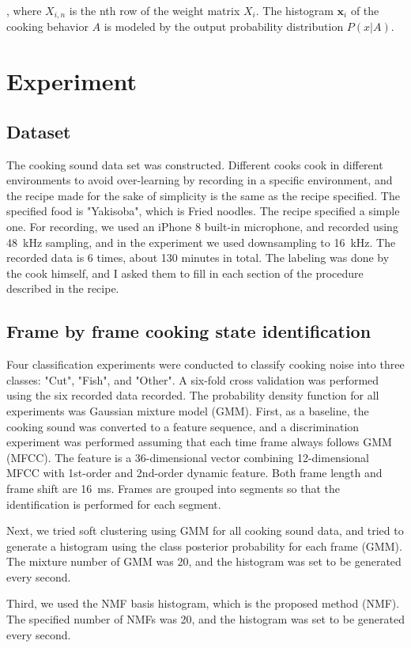 \documentclass[sigconf]{acmart}
\begin{document}
, where $ X_ {i, n} $ is the nth row of the weight matrix $ X_i $.
The histogram $ \bm {x} _i $ of the cooking behavior $ A $ is modeled by the output probability distribution $ P (x | A) $.

\section{Experiment}
\subsection{Dataset}
The cooking sound data set was constructed. Different cooks cook in different environments to avoid over-learning by recording in a specific environment, and the recipe made for the sake of simplicity is the same as the recipe specified.
The specified food is "Yakisoba", which is Fried noodles. The recipe specified a simple one.
For recording, we used an iPhone 8 built-in microphone, and recorded using \SI{48}{kHz} sampling, and in the experiment we used downsampling to \SI{16}{kHz}. The recorded data is 6 times, about 130 minutes in total.
The labeling was done by the cook himself, and I asked them to fill in each section of the procedure described in the recipe.

\subsection{Frame by frame cooking state identification}
Four classification experiments were conducted to classify cooking noise into three classes: "Cut", "Fish", and "Other". A six-fold cross validation was performed using the six recorded data recorded. The probability density function for all experiments was Gaussian mixture model (GMM).
First, as a baseline, the cooking sound was converted to a feature sequence, and a discrimination experiment was performed assuming that each time frame always follows GMM (MFCC).
The feature is a 36-dimensional vector combining 12-dimensional MFCC with 1st-order and 2nd-order dynamic feature. Both frame length and frame shift are \SI{16}{ms}. Frames are grouped into segments so that the identification is performed for each segment.

Next, we tried soft clustering using GMM for all cooking sound data, and tried to generate a histogram using the class posterior probability for each frame (GMM). The mixture number of GMM was 20, and the histogram was set to be generated every second.

Third, we used the NMF basis histogram, which is the proposed method (NMF). The specified number of NMFs was 20, and the histogram was set to be generated every second.
\end{document}

